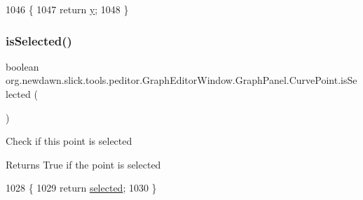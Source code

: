 \begin{DoxyCode}
1046                                 \{
1047                 \textcolor{keywordflow}{return} \mbox{\hyperlink{classorg_1_1newdawn_1_1slick_1_1tools_1_1peditor_1_1_graph_editor_window_1_1_graph_panel_1_1_curve_point_a192de23a4a5d1bdcdb9599de910cc4e5}{y}};
1048             \}
\end{DoxyCode}
\mbox{\label{classorg_1_1newdawn_1_1slick_1_1tools_1_1peditor_1_1_graph_editor_window_1_1_graph_panel_1_1_curve_point_a50644c1f8f78cd69536278cf2ef2e090}} 
\subsubsection{\texorpdfstring{is\+Selected()}{isSelected()}}
{\footnotesize\ttfamily boolean org.\+newdawn.\+slick.\+tools.\+peditor.\+Graph\+Editor\+Window.\+Graph\+Panel.\+Curve\+Point.\+is\+Selected (\begin{DoxyParamCaption}{ }\end{DoxyParamCaption})\hspace{0.3cm}{\ttfamily [inline]}}

Check if this point is selected

\begin{DoxyReturn}{Returns}
True if the point is selected 
\end{DoxyReturn}

\begin{DoxyCode}
1028                                         \{
1029                 \textcolor{keywordflow}{return} \mbox{\hyperlink{classorg_1_1newdawn_1_1slick_1_1tools_1_1peditor_1_1_graph_editor_window_1_1_graph_panel_1_1_curve_point_a606ae5d752030e493c64a1422f42ba17}{selected}};
1030             \}
\end{DoxyCode}


